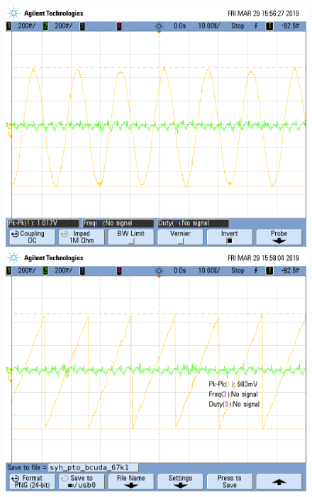 \documentclass[../../ASSD_TP1_G7.tex]{subfiles}
\begin{document}
\begin{figure}[H]

\begin{centering}
\includegraphics[scale=0.25]{Imagenes/syh_pto_bsin_67k}\includegraphics[scale=0.25]{Imagenes/syh_pto_bcuda_67k1}
\par\end{centering}
\begin{centering}

\end{centering}
\end{figure}
\end{document}
